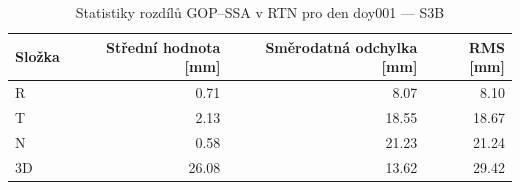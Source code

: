 \begin{table}[H]
\centering
\caption{Statistiky rozdílů GOP–SSA v RTN pro den doy001 — S3B}
\label{tab:bs_ZAZG_doy001_day_stats}
\begin{tabular}{lrrr}
\toprule
Složka & Střední hodnota [mm] & Směrodatná odchylka [mm] & RMS [mm] \\
\midrule
R & 0.71 & 8.07 & 8.10 \\
T & 2.13 & 18.55 & 18.67 \\
N & 0.58 & 21.23 & 21.24 \\
3D & 26.08 & 13.62 & 29.42 \\
\bottomrule
\end{tabular}
\end{table}
